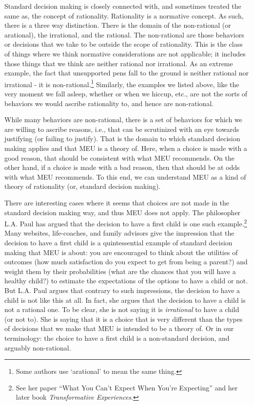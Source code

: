 \documentclass[]{tufte-book}
\begin{document}
Standard decision making is closely connected with, and sometimes treated the same as, the concept of rationality. Rationality is a normative concept. As such, there is a three way distinction. There is the domain of the non-rational (or arational), the irrational, and the rational. The non-rational are those behaviors or decisions that we take to be outside the scope of rationality. This is the class of things where we think normative considerations are not applicable; it includes those things that we think are neither rational nor irrational. As an extreme example, the fact that unsupported pens fall to the ground is neither rational nor irrational - it is non-rational.\footnote{Some authors use `arational' to mean the same thing.} Similarly, the examples we listed above, like the very moment we fall asleep, whether or when we hiccup, etc., are not the sorts of behaviors we would ascribe rationality to, and hence are non-rational.

While many behaviors are non-rational, there is a set of behaviors for which we are willing to ascribe reasons, i.e., that can be scrutinized with an eye towards justifying (or failing to justify). That is the domain to which standard decision making applies and that MEU is a theory of. Here, when a choice is made with a good reason, that should be consistent with what MEU recommends. On the other hand, if a choice is made with a bad reason, then that should be at odds with what MEU recommends. To this end, we can understand MEU as a kind of theory of rationality (or, standard decision making).

There are interesting cases where it seems that choices are not made in the standard decision making way, and thus MEU does not apply. The philosopher L.A. Paul has argued that the decision to have a first child is one such example.\footnote{See her paper ``What You Can't Expect When You're Expecting'' and her later book \emph{Transformative Experiences}.} Many websites, life-coaches, and family advisors give the impression that the decision to have a first child is a quintessential example of standard decision making that MEU is about: you are encouraged to think about the utilities of outcomes (how much satisfaction do you expect to get from being a parent?) and weight them by their probabilities (what are the chances that you will have a healthy child?) to estimate the expectations of the options to have a child or not. But L.A. Paul argues that contrary to such impressions, the decision to have a child is not like this at all. In fact, she argues that the decision to have a child is not a rational one. To be clear, she is not saying it is \emph{irrational} to have a child (or not to). She is saying that it is a choice that is very different than the types of decisions that we make that MEU is intended to be a theory of. Or in our terminology: the choice to have a first child is a non-standard decision, and arguably non-rational.
\end{document}
